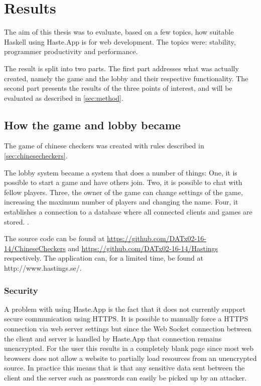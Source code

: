 \documentclass[a4paper]{article}
\begin{document}
\section{Results}

The aim of this thesis was to evaluate, based on a few topics, how suitable Haskell using Haste.App is for web development.
The topics were: stability, programmer productivity and performance.

The result is split into two parts. The first part addresses what was actually created, namely the game and the lobby and their respective functionality. The second part presents the results of the three points of interest, and will be evaluated as described in \cref{sec:method}.

\subsection{How the game and lobby became}
\label{sub:game-lobby-results}
The game of chinese checkers was created with rules described in \cref{sec:chinesecheckers}.

The lobby system became a system that does a number of things: One, it is possible to start a game and have others join. Two, it is possible to chat with fellow players. Three, the owner of the game can change settings of the game, increasing the maximum number of players and changing the name. Four, it establishes a connection to a database where all connected clients and games are stored. .

The source code can be found at \url{https://github.com/DATx02-16-14/ChineseCheckers} and \url{https://github.com/DATx02-16-14/Hastings} respectively. The application can, for a limited time, be found at http://www.hastings.se/. 

\subsubsection{Security}
A problem with using Haste.App is the fact that it does not currently support secure communication using HTTPS. It is possible to manually force a HTTPS connection via web server settings but since the Web Socket connection between the client and server is handled by Haste.App that connection remains unencrypted. For the user this results in a completely blank page since most web browsers does not allow a website to partially load resources from an unencrypted source. In practice this means that is that any sensitive data sent between the client and the server such as passwords can easily be picked up by an attacker.
\end{document}
